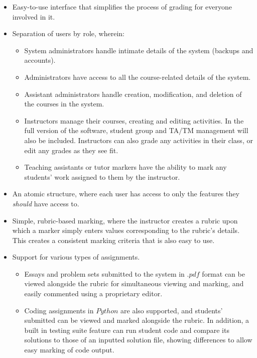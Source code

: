 \documentclass{article}
\begin{document}
\begin{itemize}
  \item Easy-to-use interface that simplifies the process of grading for everyone
    involved in it.
  \item Separation of users by role, wherein:
    \begin{itemize}
      \item System administrators handle intimate details of the system (backups and
	accounts).
      \item Administrators have access to all the course-related details of the system.
      \item Assistant administrators handle creation, modification, and deletion of the
	courses in the system.
      \item Instructors manage their courses, creating and editing activities.
        In the full version of the software, student group and TA/TM management
        will also be included. Instructors can also grade any activities in their
        class, or edit any grades as they see fit.
      \item Teaching assistants or tutor markers have the ability to mark any students'
	work assigned to them by the instructor.
    \end{itemize}
  \item An atomic structure, where each user has access to only the features they 
    \emph{should} have access to.
  \item Simple, rubric-based marking, where the instructor creates a rubric upon which
    a marker simply enters values corresponding to the rubric's details. This creates
    a consistent marking criteria that is also easy to use.
  \item Support for various types of assignments. 
    \begin{itemize}
      \item Essays and problem sets submitted to the system in $.pdf$ format can be 
	viewed alongside the rubric for simultaneous viewing and marking, and easily 
	commented using a proprietary editor. 
      \item Coding assignments in $Python$ are also supported, and students' submitted
	can be viewed and marked alongside the rubric. In addition, a built in testing
	suite feature can run student code and compare its solutions to those of an
	inputted solution file, showing differences to allow easy marking of code
	output.
    \end{itemize}
\end{itemize}
\end{document}
